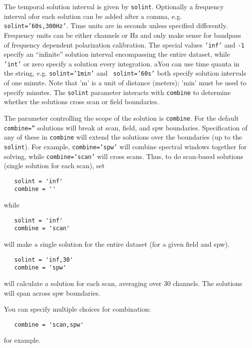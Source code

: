 {The temporal solution interval is given by {\tt solint}. Optionally a
frequency interval ofor each solution can be added after a comma,
e.g. {\tt solint='60s,300Hz'}. Time units are in seconds unless
specified differently. Frequency units can be either channels or Hz
and only make sense for bandpass of frequency dependent polarization
calibration.  The special values {\tt 'inf'} and {\tt -1} specify an
``infinite'' solution interval encompassing the entire dataset, while
{\tt 'int'} or zero specify a solution every integration.  aYou can
use time quanta in the string, e.g. {\tt solint='1min'} and {\tt
  solint='60s'} both specify solution intervals of one minute.  Note
that 'm' is a unit of distance (meters); 'min' must be used to specify
minutes.  The {\tt solint} parameter interacts with {\tt combine} to
determine whether the solutions cross scan or field boundaries.

The parameter controlling the scope of the solution is {\tt combine}.
For the default {\tt combine=''} solutions will break at scan, field, and spw
boundaries.  Specification of any of these in {\tt combine} will
extend the solutions over the boundaries (up to the {\tt solint}). 
For example, {\tt combine='spw'} will combine spectral windows
together for solving, while {\tt combine='scan'} will cross scans.  
Thus, to do scan-based solutions (single solution for each scan), set
\small
\begin{verbatim}
   solint = 'inf'
   combine = ''
\end{verbatim} 
\normalsize
while
\small
\begin{verbatim}
   solint = 'inf'
   combine = 'scan'
\end{verbatim} 
\normalsize
will make a single solution for the entire dataset (for a given field
and spw).  
\small
\begin{verbatim}
   solint = 'inf,30'
   combine = 'spw'
\end{verbatim}
will calculate a solution for each scan, averaging over 30
channels. The solutions will span across spw boundaries. 

You can specify multiple choices for combination:
\small
\begin{verbatim}
   combine = 'scan,spw'
\end{verbatim} 
\normalsize
for example.

}
